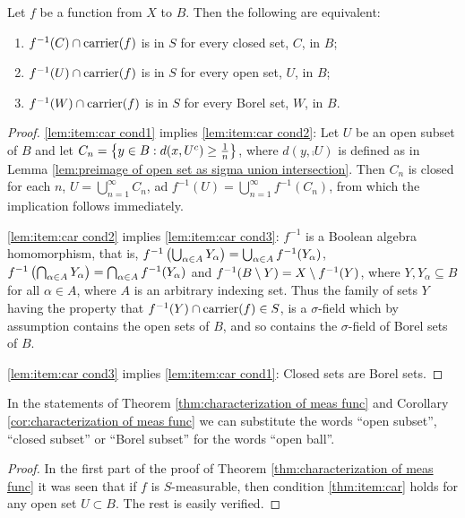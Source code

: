 \begin{lemma}
Let $f$ be a function from $X$ to $B$. Then the following are equivalent:
\begin{enumerate}[label=\arabic*),ref=\arabic*)]
    \item\label{lem:item:car cond1}
    $f^{-1}(C)\cap\operatorname{carrier}(f)$ is in $S$ for every closed set, $C$, in $B$;
    \item\label{lem:item:car cond2}
    $f^{-1}(U)\cap\operatorname{carrier}(f)$ is in $S$ for every open set, $U$, in $B$;
    \item\label{lem:item:car cond3}
    $f^{-1}(W)\cap\operatorname{carrier}(f)$ is in $S$ for every Borel set, $W$, in $B$.
\end{enumerate}
\end{lemma}
\begin{proof}
\ref{lem:item:car cond1} implies \ref{lem:item:car cond2}: Let $U$ be an open subset of $B$ and let $C_n=\left\{y\in B:d(x,{U}^c)\geq\frac1n\right\}$, where $d(y,\comp{U})$ is defined as in Lemma \ref{lem:preimage of open set as sigma union intersection}. Then $C_n$ is closed for each $n$, $U=\bigcup_{n=1}^\infty C_n$, ad $f^{-1}(U)=\bigcup_{n=1}^\infty f^{-1}(C_n)$, from which the implication follows immediately.

\ref{lem:item:car cond2} implies \ref{lem:item:car cond3}: $f^{-1}$ is a Boolean algebra homomorphism, that is, $f^{-1}\left(\bigcup_{\alpha\in A}Y_\alpha\right)=\bigcup_{\alpha\in A}f^{-1}(Y_\alpha)$, $f^{-1}\left(\bigcap_{\alpha\in A}Y_\alpha\right)=\bigcap_{\alpha\in A}f^{-1}(Y_\alpha)$ and $f^{-1}(B\setminus Y)=X\setminus f^{-1}(Y)$, where $Y,Y_\alpha\subseteq B$ for all $\alpha\in A$, where $A$ is an arbitrary indexing set. Thus the family of sets $Y$ having the property that $f^{-1}(Y)\cap\operatorname{carrier}(f)\in S$, is a $\sigma$-field which by assumption contains the open sets of $B$, and so contains the $\sigma$-field of Borel sets of $B$.

\ref{lem:item:car cond3} implies \ref{lem:item:car cond1}: Closed sets are Borel sets.
\end{proof}

\begin{corollary}
In the statements of Theorem \ref{thm:characterization of meas func} and Corollary \ref{cor:characterization of meas func} we can substitute the words ``open subset'', ``closed subset'' or ``Borel subset'' for the words ``open ball''.
\end{corollary}

\begin{proof}
In the first part of the proof of Theorem \ref{thm:characterization of meas func} it was seen that if $f$ is $S$-measurable, then condition \ref{thm:item:car} holds for any open set $U \subset B$. The rest is easily verified.
\end{proof}

